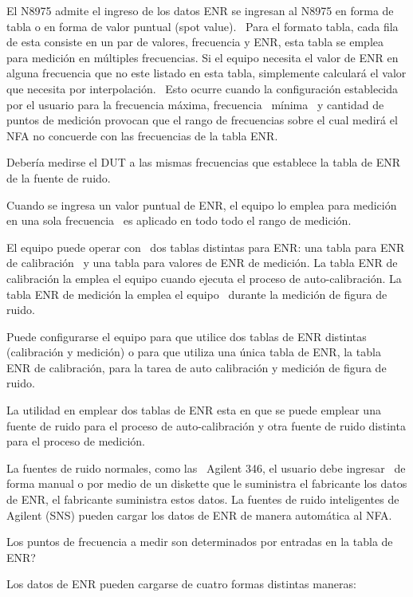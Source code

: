 	El N8975 admite el ingreso de los datos ENR se ingresan al N8975 en forma de tabla o en forma de valor puntual (spot
	value). \ Para el formato tabla, cada fila de esta consiste en un par de valores, frecuencia y ENR, esta tabla se
	emplea para medición en múltiples frecuencias. Si el equipo necesita el valor de ENR en alguna frecuencia que no este
	listado en esta tabla, simplemente calculará el valor que necesita por interpolación. \ Esto ocurre cuando la
	configuración establecida por el usuario para la frecuencia máxima, frecuencia \ mínima \ y cantidad de puntos de
	medición provocan que el rango de frecuencias sobre el cual medirá el NFA no concuerde con las frecuencias de la tabla
	ENR. 
	
	Debería medirse el DUT a las mismas frecuencias que establece la tabla de ENR de la fuente de ruido.
	
	Cuando se ingresa un valor puntual de ENR, el equipo lo emplea para medición en una sola frecuencia \ es aplicado en
	todo todo el rango de medición.
	
	El equipo puede operar con \ dos tablas distintas para ENR: una tabla para ENR de calibración \ y una tabla para valores
	de ENR de medición. La tabla ENR de calibración la emplea el equipo cuando ejecuta el proceso de auto-calibración. La
	tabla ENR de medición la emplea el equipo \ durante la medición de figura de ruido. \ 
	
	Puede configurarse el equipo para que utilice dos tablas de ENR distintas (calibración y medición) o para que utiliza
	una única tabla de ENR, la tabla ENR de calibración, para la tarea de auto calibración y medición de figura de ruido.
	
	La utilidad en emplear dos tablas de ENR esta en que se puede emplear una fuente de ruido para el proceso de
	auto-calibración y otra fuente de ruido distinta para el proceso de medición. 
	
	La fuentes de ruido normales, como las \ Agilent 346, el usuario debe ingresar \ de forma manual o por medio de un
	diskette que le suministra el fabricante los datos de ENR, el fabricante suministra estos datos. La fuentes de ruido
	inteligentes de Agilent (SNS) pueden cargar los datos de ENR de manera automática al NFA.
	
	Los puntos de frecuencia a medir son determinados por entradas en la tabla de ENR?
	
	Los datos de ENR pueden cargarse de cuatro formas distintas maneras:
	
